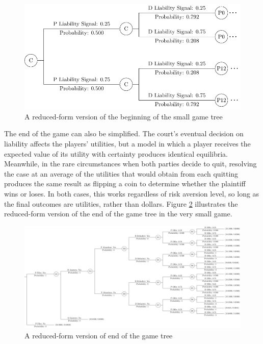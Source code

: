 \documentclass{article}
\begin{document}
\begin{figure}[h!]
\centering
\includegraphics[scale=0.25, trim={0in 0in 0in 0in}, clip]{../Figures/game tree 2x2x2 beginning simplified.pdf}
\caption{A reduced-form version of the beginning of the small game tree}
\label{fig:gametree2x2x2beginning_reduced}
\end{figure}

The end of the game can also be simplified. The court's eventual decision on liability affects the players' utilities, but a model in which a player receives the expected value of its utility with certainty produces identical equilibria. Meanwhile, in the rare circumstances when both parties decide to quit, resolving the case at an average of the utilities that would obtain from each quitting produces the same result as flipping a coin to determine whether the plaintiff wins or loses. In both cases, this works regardless of risk aversion level, so long as the final outcomes are utilities, rather than dollars. Figure \ref{fig:gametree2x2x2end_reduced} illustrates the reduced-form version of the end of the game tree in the very small game.

\begin{figure}[h!]
\centering
\includegraphics[scale=0.25, trim={0in 0in 0in 0in}, clip]{../Figures/game tree 2x2x2 end simplified.pdf}
\caption{A reduced-form version of end of the game tree}
\label{fig:gametree2x2x2end_reduced}
\end{figure}
\end{document}
